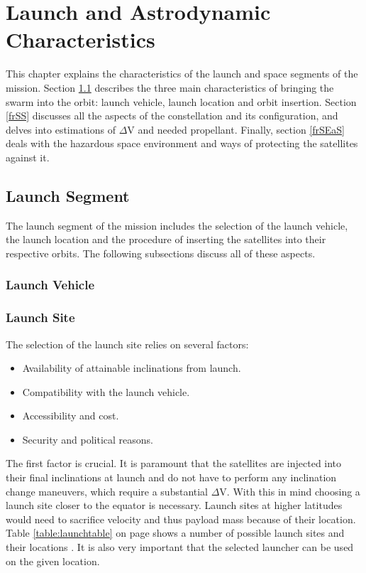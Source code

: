\chapter{Launch and Astrodynamic Characteristics}
\label{frLaAC}
This chapter explains the characteristics of the launch and space segments of the mission. Section \ref{frLS} describes the three main characteristics of bringing the swarm into the orbit: launch vehicle, launch location and orbit insertion. Section \ref{frSS} discusses all the aspects of the constellation and its configuration, and delves into estimations of $\Delta$V and needed propellant. Finally, section \ref{frSEaS} deals with the hazardous space environment and ways of protecting the satellites against it. 

\section{Launch Segment}
\label{frLS}

The launch segment of the mission includes the selection of the launch vehicle, the launch location and the procedure of inserting the satellites into their respective orbits. The following subsections discuss all of these aspects. 

\subsection{Launch Vehicle}
\label{frLSLV}



\subsection{Launch Site}
\label{frLSLS}

The selection of the launch site relies on several factors:

\begin{itemize}
	\item Availability of attainable inclinations from launch.
	\item Compatibility with the launch vehicle.
	\item Accessibility and cost.
	\item Security and political reasons. 
\end{itemize}

The first factor is crucial. It is paramount that the satellites are injected into their final inclinations at launch and do not have to perform any inclination change maneuvers, which require a substantial $\Delta$V. With this in mind choosing a launch site closer to the equator is necessary. Launch sites at higher latitudes would need to sacrifice velocity and thus payload mass because of their location. Table \ref{table:launchtable} on page \pageref{table:launchtable} shows a number of possible launch sites and their locations \cite{larson}. It is also very important that the selected launcher can be used on the given location.

